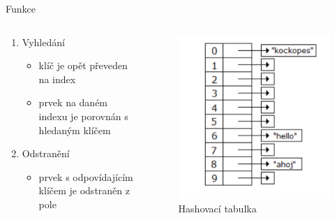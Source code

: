 \documentclass[10pt, hyperref={unicode}]{beamer}
\begin{document}
\begin{frame}{Funkce}

    \begin{columns}[T]
    \begin{column}{.6\textwidth}

        \begin{enumerate}
        
        \item Vyhledání
        \begin{itemize}
            \item klíč je opět převeden na index
            \item prvek na daném indexu je porovnán s hledaným klíčem
        \end{itemize}

        \item Odstranění
        \begin{itemize}
            \item prvek s odpovídajícím klíčem je odstraněn z pole
        \end{itemize}
    \end{enumerate}

    \end{column}
    \begin{column}{.4\textwidth}

    \begin{figure}
        \centering
        \includegraphics[width=1\linewidth]{hash.pdf}
        \caption{Hashovací tabulka}
        \label{Obrazek 1}
    \end{figure}
    \end{column}
  \end{columns}
    
    
\end{frame}
        
\end{document}
